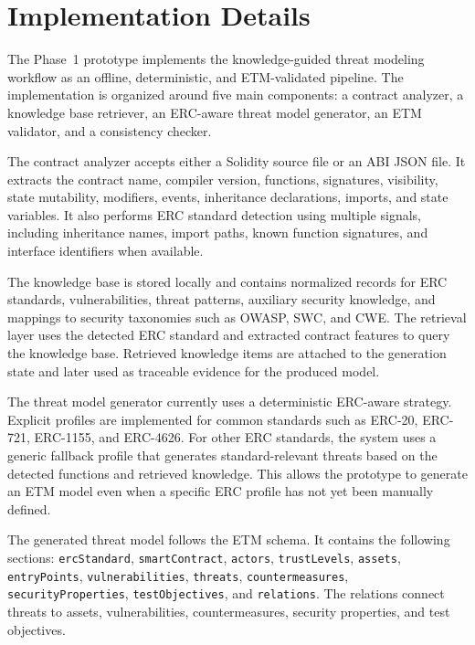 \section{Implementation Details}
\label{sec:implementation-details}

The Phase~1 prototype implements the knowledge-guided threat modeling workflow as an offline, deterministic, and ETM-validated pipeline. The implementation is organized around five main components: a contract analyzer, a knowledge base retriever, an ERC-aware threat model generator, an ETM validator, and a consistency checker.

The contract analyzer accepts either a Solidity source file or an ABI JSON file. It extracts the contract name, compiler version, functions, signatures, visibility, state mutability, modifiers, events, inheritance declarations, imports, and state variables. It also performs ERC standard detection using multiple signals, including inheritance names, import paths, known function signatures, and interface identifiers when available.

The knowledge base is stored locally and contains normalized records for ERC standards, vulnerabilities, threat patterns, auxiliary security knowledge, and mappings to security taxonomies such as OWASP, SWC, and CWE. The retrieval layer uses the detected ERC standard and extracted contract features to query the knowledge base. Retrieved knowledge items are attached to the generation state and later used as traceable evidence for the produced model.

The threat model generator currently uses a deterministic ERC-aware strategy. Explicit profiles are implemented for common standards such as ERC-20, ERC-721, ERC-1155, and ERC-4626. For other ERC standards, the system uses a generic fallback profile that generates standard-relevant threats based on the detected functions and retrieved knowledge. This allows the prototype to generate an ETM model even when a specific ERC profile has not yet been manually defined.

The generated threat model follows the ETM schema. It contains the following sections: \texttt{ercStandard}, \texttt{smartContract}, \texttt{actors}, \texttt{trustLevels}, \texttt{assets}, \texttt{entryPoints}, \texttt{vulnerabilities}, \texttt{threats}, \texttt{countermeasures}, \texttt{securityProperties}, \texttt{testObjectives}, and \texttt{relations}. The relations connect threats to assets, vulnerabilities, countermeasures, security properties, and test objectives.

